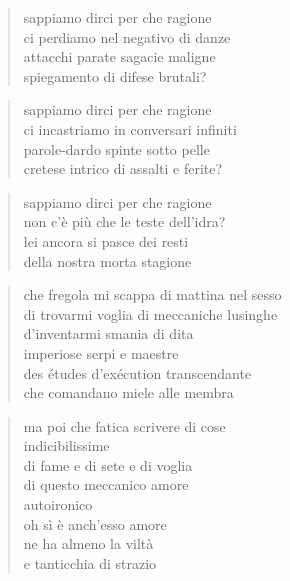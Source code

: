 
\vspace*{2cm}

	\begin{verse}
		sappiamo dirci per che ragione\\
		ci perdiamo nel negativo di danze\\
		attacchi parate sagacie maligne\\
		spiegamento di difese brutali?
	\end{verse}

	\begin{verse}
		sappiamo dirci per che ragione\\
		ci incastriamo in conversari infiniti\\
		parole-dardo spinte sotto pelle\\
		cretese intrico di assalti e ferite?
	\end{verse}

	\begin{verse}
		sappiamo dirci per che ragione\\
		non c'è più che le teste dell'idra?\\
		lei ancora si pasce dei resti\\
		della nostra morta stagione
	\end{verse}

\clearpage


\vspace*{2cm}

	\begin{verse}
		che fregola mi scappa di mattina nel sesso\\
		di trovarmi voglia di meccaniche lusinghe\\
		d'inventarmi smania di dita\\
		imperiose serpi e maestre\\
		des études d'exécution transcendante\\
		che comandano miele alle membra
	\end{verse}

	\begin{verse}
		ma poi che fatica scrivere di cose\\
		indicibilissime\\
		di fame e di sete e di voglia\\
		di questo meccanico amore\\
		autoironico\\
		oh sì è anch'esso amore\\
		ne ha almeno la viltà\\
		e tanticchia di strazio
	\end{verse}

